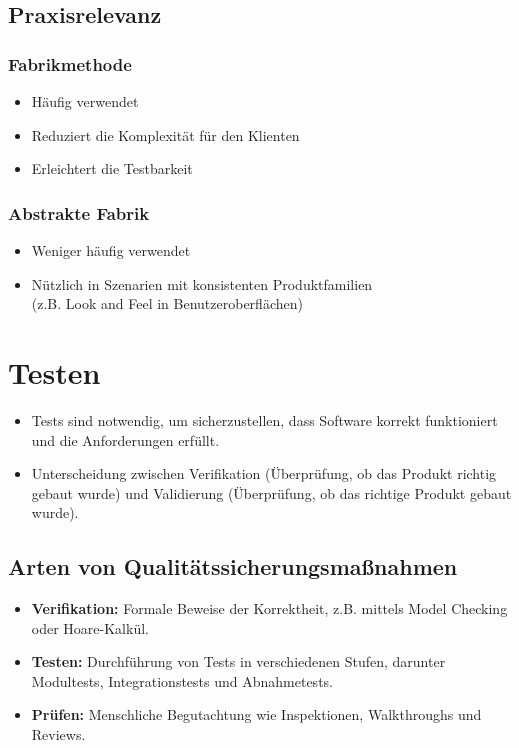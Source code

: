 \documentclass[11pt, a4paper]{article}
\begin{document}
\subsection{Praxisrelevanz}

\vspace{1em}

\begin{minipage}[h]{0.45\textwidth}
    \subsubsection*{Fabrikmethode}
    \begin{itemize}
        \item Häufig verwendet
        \item Reduziert die Komplexität für den Klienten
        \item Erleichtert die Testbarkeit
    \end{itemize}
\end{minipage}
\begin{minipage}[h]{0.45\textwidth}
    \subsubsection*{Abstrakte Fabrik}
    \begin{itemize}
        \item Weniger häufig verwendet
        \item Nützlich in Szenarien mit konsistenten Produktfamilien \\ (z.B. Look and Feel in Benutzeroberflächen)
    \end{itemize}
\end{minipage}

\newpage


\section{Testen}

\begin{itemize}
    \item Tests sind notwendig, um sicherzustellen, dass Software korrekt funktioniert und die Anforderungen erfüllt.
    \item Unterscheidung zwischen Verifikation (Überprüfung, ob das Produkt richtig gebaut wurde) und Validierung (Überprüfung, ob das richtige Produkt gebaut wurde).
\end{itemize}

\subsection{Arten von Qualitätssicherungsmaßnahmen}
\begin{itemize}
    \item \textbf{Verifikation:} Formale Beweise der Korrektheit, z.B. mittels Model Checking oder Hoare-Kalkül.
    \item \textbf{Testen:} Durchführung von Tests in verschiedenen Stufen, darunter Modultests, Integrationstests und Abnahmetests.
    \item \textbf{Prüfen:} Menschliche Begutachtung wie Inspektionen, Walkthroughs und Reviews.
\end{itemize}
\end{document}
